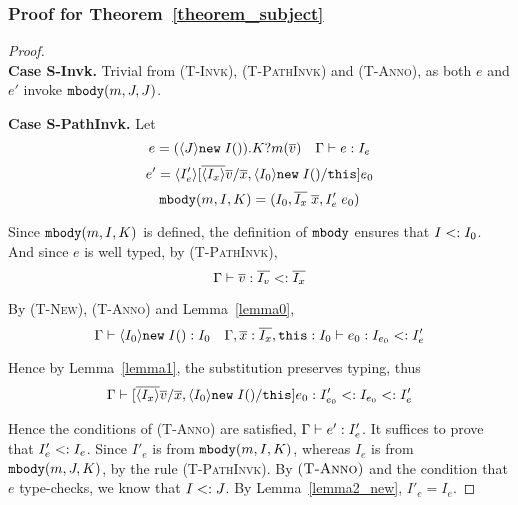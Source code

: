 \subsubsection{Proof for Theorem~\ref{theorem_subject}}
\begin{proof} ~\\
\indent \textbf{Case S-Invk.} Trivial from \textsc{(T-Invk)}, \textsc{(T-PathInvk)} and \textsc{(T-Anno)}, as both $e$ and $e'$ invoke $\texttt{mbody}(m, J, J)$.

\textbf{Case S-PathInvk.} Let
  $$e = (\langle J \rangle\texttt{new} \; I()).K?m(\overline{v}) \quad \Gamma \; {\vdash} \; e : I_e$$
  $$e' = \langle I'_e \rangle[\overline{\langle I_x \rangle} \overline{v}/\overline{x}, \langle I_0 \rangle\texttt{new} \; I()/\texttt{this}]e_0$$
  $$\texttt{mbody}(m, I, K) = (I_0, \overline{I_x} \; \overline{x}, I'_e \; e_0)$$

Since $\texttt{mbody}(m, I, K)$ is defined, the definition of $\texttt{mbody}$ ensures that $I <: I_0$. And since $e$ is well typed, by \textsc{(T-PathInvk)},
  $$\Gamma \; {\vdash} \; \overline{v} : \overline{I_v} <: \overline{I_x}$$

By \textsc{(T-New)}, \textsc{(T-Anno)} and Lemma~\ref{lemma0},
  $$\Gamma \; {\vdash} \; \langle I_0 \rangle\texttt{new} \; I() : I_0 \quad \Gamma, \overline{x} : \overline{I_x}, \texttt{this} : I_0 \; {\vdash} \; e_0 : I_{e_0} <: I'_e$$

Hence by Lemma~\ref{lemma1}, the substitution preserves typing, thus
  $$\Gamma \; {\vdash} \; [\overline{\langle I_x \rangle} \overline{v}/\overline{x}, \langle I_0 \rangle\texttt{new} \; I()/\texttt{this}]e_0 : I'_{e_0} <: I_{e_0} <: I'_e$$
  
Hence the conditions of \textsc{(T-Anno)} are satisfied, $\Gamma \; {\vdash} \; e' : I'_e$. It suffices to prove that $I'_e <: I_e$. Since $I'_e$ is from $\texttt{mbody}(m, I, K)$, whereas $I_e$ is from $\texttt{mbody}(m, J, K)$, by the rule  \textsc{(T-PathInvk)}. By $\textsc{(T-Anno)}$ and the condition that $e$ type-checks, we know that $I <: J$. By Lemma~\ref{lemma2_new}, $I'_e = I_e$.

\begin{comment}
\noindent \textbf{Case Invk.} 
let \[ e = \angl{J}\new I.m(\overline{\angl{I_e}}\overline{e}) \] 
Suppose \[ \mbody(m, I, J) = (J', \overline{I_x} \; \overline{x}, I_{e_0} \; e_0) \] 
then \[ e' =  [\overline{\angl{I_x}} \overline{e}/\overline{x}, \; \angl{J}\new I/\kwthis ] e_0 \] 
By rules \textsc{(T-New)} and \textsc{(T-Invk)}, 
  \[ \judgeewf \Gamma {\new I:I} \quad 
     \mtype(m, I, J) = \overline{I_x} \rightarrow I_{e_0} \quad 
     \judgeewf \Gamma {\overline{e} : \overline{I_e'}} \quad
     \overline{I_e'} \subtype \overline{I_x} \quad
     \textit{, for some } \; \overline{I_e'}
  \]
By Lemma~\ref{lemma0},
    \[
    \judgeewf {\Gamma, \overline{x}:\overline{I_x}, \kwthis:J_0} {e_0:I_f} \textit{, for some } J \subtype J_0 \textit{ and } I_f \subtype I_{e_0}
    \]
By Lemma~\ref{lemma1},
    \[
    \judgeewf {\Gamma} {[\overline{\angl{I_x}} \overline{e}/\overline{x}, \; \angl{J}\new I/\kwthis ] e_0  :  I_g} \textit{, for some } I_g \subtype I_f 
    \]
So $I_g <: I_{e_0}$, finally just let $I' = I_g$.


\end{comment}
\end{proof}
